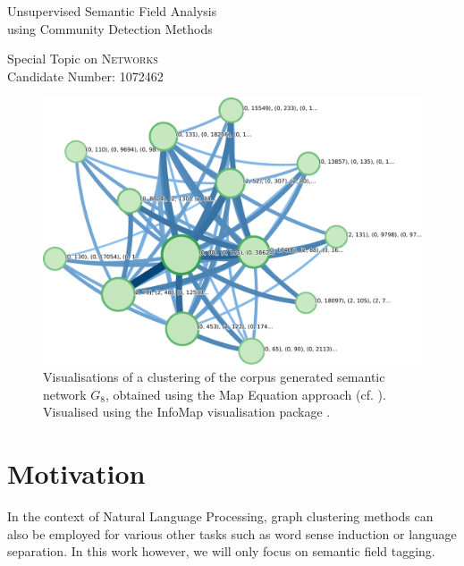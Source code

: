 \documentclass[12pt, a4paper]{article}
\title{\topictitle}
\author{Candidate \candidatenumber}
\date{\today}
\newcommand{\topictitle}{Unsupervised Semantic Field Analysis \\ \large using Community Detection Methods}
\newcommand{\candidatenumber}{1072462}
\newcommand{\course}{Networks}
\begin{document}
  \pagestyle{plain}
  \begin{center}
    \vspace*{-2.5cm}
    \Large \topictitle \\
    \vspace{.3cm}

    \normalsize Special Topic on \textcolor{themecolor3}{\textsc{\course}}\\
    \normalsize Candidate Number: \textcolor{themecolor3}{\candidatenumber}
    \vspace{.3cm}
  \end{center}

  \begin{abstract}
    \label{abstract}
    This work will attempt to
  \end{abstract}

  \begin{figure}[H]
    \centering
    \includegraphics[width=0.8\linewidth]{figures/library-graph-12.pajek.ftree.pdf}
    \caption{Visualisations of a clustering of the corpus generated semantic network $G_8$, obtained using the Map Equation approach (cf. ). Visualised using the InfoMap visualisation package \parencite{mapequation}.}
    \label{fig:mapequation}
  \end{figure}

  \pagebreak
  \pagestyle{normal}

  \tableofcontents
  \pagebreak

  \section{Motivation}
  In the context of Natural Language Processing, graph clustering methods can also be employed for various other tasks such as word sense induction or language separation.
  In this work however, we will only focus on semantic field tagging.
\end{document}
